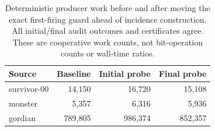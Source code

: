 \begin{table}[htbp]
\centering\small
\begin{tabular}{lrrr}
\toprule
Source & Baseline & Initial probe & Final probe \\
\midrule
survivor-00 & 14,150 & 16,720 & 15,108 \\
monster & 5,357 & 6,316 & 5,936 \\
gordian & 789,805 & 986,374 & 852,357 \\
\bottomrule
\end{tabular}
\caption{Deterministic producer work before and after moving the exact first-firing guard ahead of incidence construction. All initial/final audit outcomes and certificates agree. These are cooperative work counts, not bit-operation counts or wall-time ratios.}
\label{tab:raw-saturation-guard}
\end{table}
